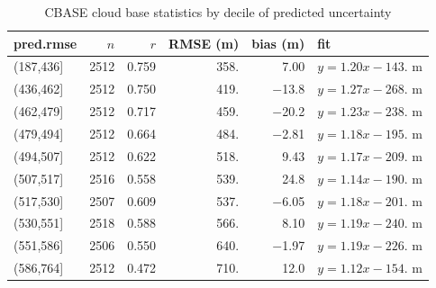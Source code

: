 \documentclass[amt,manuscript]{copernicus}\usepackage[]{graphicx}\usepackage[]{color}
\begin{document}
\begin{table}[t]
  \centering
  \caption{CBASE cloud base statistics by decile of predicted uncertainty}
  \label{tab:rmseclass}
\begin{tabular}{lrrrrl}
  \hline
\hline
pred.rmse & $n$ & $r$ & RMSE (m) & bias (m) & fit \\ 
  \hline
(187,436] & 2512 & 0.759 & 358. & 7.00 & $y = 1.20 x - 143.$ m \\ 
  (436,462] & 2512 & 0.750 & 419. & $-$13.8 & $y = 1.27 x - 268.$ m \\ 
  (462,479] & 2512 & 0.717 & 459. & $-$20.2 & $y = 1.23 x - 238.$ m \\ 
  (479,494] & 2512 & 0.664 & 484. & $-$2.81 & $y = 1.18 x - 195.$ m \\ 
  (494,507] & 2512 & 0.622 & 518. & 9.43 & $y = 1.17 x - 209.$ m \\ 
  (507,517] & 2516 & 0.558 & 539. & 24.8 & $y = 1.14 x - 190.$ m \\ 
  (517,530] & 2507 & 0.609 & 537. & $-$6.05 & $y = 1.18 x - 201.$ m \\ 
  (530,551] & 2518 & 0.588 & 566. & 8.10 & $y = 1.19 x - 240.$ m \\ 
  (551,586] & 2506 & 0.550 & 640. & $-$1.97 & $y = 1.19 x - 226.$ m \\ 
  (586,764] & 2512 & 0.472 & 710. & 12.0 & $y = 1.12 x - 154.$ m \\ 
   \hline
\hline
\end{tabular}

\end{table}
\end{document}
